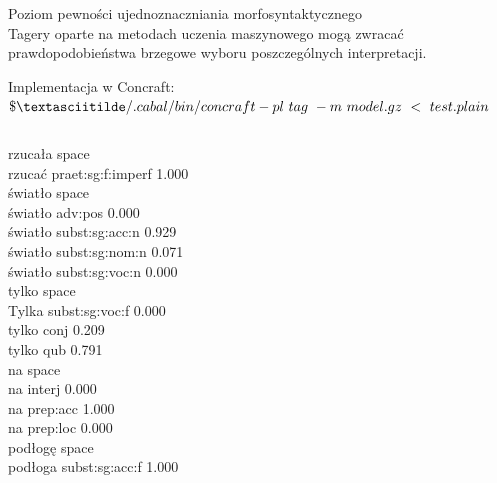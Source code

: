 \documentclass{beamer}
\begin{document}
\begin{frame}{Poziom pewności ujednoznaczniania morfosyntaktycznego}
  \\
  Tagery oparte na metodach uczenia maszynowego mogą zwracać prawdopodobieństwa brzegowe wyboru poszczególnych interpretacji.
  \vspace{0.25cm}

  Implementacja w Concraft:\\
  $\$ \textasciitilde/.cabal/bin/concraft-pl\ tag\ -m\ model.gz\ <\ test.plain$
  \begin{columns}[t]
  \scriptsize
  rzucała space\\
  \hspace{1cm}rzucać  praet:sg:f:imperf 1.000\\
  światło space\\
  \hspace{1cm}światło adv:pos 0.000\\
  \hspace{1cm}światło subst:sg:acc:n  0.929\\
  \hspace{1cm}światło subst:sg:nom:n  0.071\\
  \hspace{1cm}światło subst:sg:voc:n  0.000\\
  \scriptsize
  tylko space\\
  \hspace{1cm}Tylka   subst:sg:voc:f  0.000\\
  \hspace{1cm}tylko   conj    0.209\\
  \hspace{1cm}tylko   qub     0.791\\
  na    space\\
  \hspace{1cm}na      interj  0.000\\
  \hspace{1cm}na      prep:acc        1.000\\
  \hspace{1cm}na      prep:loc        0.000\\
  podłogę space\\
  \hspace{1cm}podłoga subst:sg:acc:f  1.000\\
\end{columns}
\end{frame}
\end{document}
